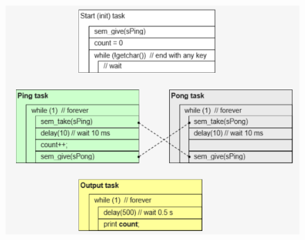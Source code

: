  	\begin{figure}[h]
    \centering
    \includegraphics[width=13cm, height=9cm]{Images/image133.png}
    \label{fig:Fig }
    \end{figure}


